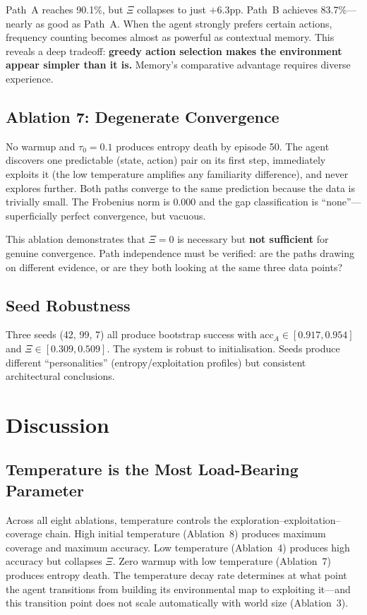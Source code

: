 \documentclass[11pt,a4paper]{article}
\begin{document}
Path~A reaches 90.1\%, but $\Xi$ collapses to just $+$6.3pp. Path~B achieves 83.7\%---nearly as good as Path~A. When the agent strongly prefers certain actions, frequency counting becomes almost as powerful as contextual memory. This reveals a deep tradeoff: \textbf{greedy action selection makes the environment appear simpler than it is.} Memory's comparative advantage requires diverse experience.

\subsection{Ablation 7: Degenerate Convergence}

No warmup and $\tau_0 = 0.1$ produces entropy death by episode 50. The agent discovers one predictable (state, action) pair on its first step, immediately exploits it (the low temperature amplifies any familiarity difference), and never explores further. Both paths converge to the same prediction because the data is trivially small. The Frobenius norm is 0.000 and the gap classification is ``none''---superficially perfect convergence, but vacuous.

This ablation demonstrates that $\Xi = 0$ is necessary but \textbf{not sufficient} for genuine convergence. Path independence must be verified: are the paths drawing on different evidence, or are they both looking at the same three data points?

\subsection{Seed Robustness}

Three seeds (42, 99, 7) all produce bootstrap success with $\text{acc}_A \in [0.917, 0.954]$ and $\Xi \in [0.309, 0.509]$. The system is robust to initialisation. Seeds produce different ``personalities'' (entropy/exploitation profiles) but consistent architectural conclusions.

\section{Discussion}

\subsection{Temperature is the Most Load-Bearing Parameter}

Across all eight ablations, temperature controls the exploration--exploitation--coverage chain. High initial temperature (Ablation~8) produces maximum coverage and maximum accuracy. Low temperature (Ablation~4) produces high accuracy but collapses $\Xi$. Zero warmup with low temperature (Ablation~7) produces entropy death. The temperature decay rate determines at what point the agent transitions from building its environmental map to exploiting it---and this transition point does not scale automatically with world size (Ablation~3).
\end{document}
